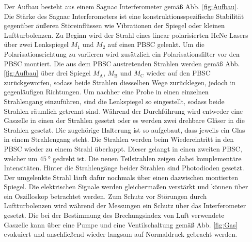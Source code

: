 Der Aufbau besteht aus einem Sagnac Interferometer gemäß Abb. \ref{fig:Aufbau}. Die Stärke des Sagnac Interferometers ist eine konstruktionsspezifische Stabilität gegenüber äußeren Störeinflüssen wie Vibrationen der Spiegel oder kleinen Luftturbolenzen. Zu Beginn wird der Strahl eines linear polarisierten HeNe Lasers über zwei Lenkspiegel $M_\text{1}$ und $M_\text{2}$ auf einen PBSC gelenkt. Um die Polarisationsrichtung zu variieren wird zusätzlich ein Polarisationsfilter vor den PBSC montiert. Die aus dem PBSC austretenden Strahlen werden gemäß Abb. \ref{fig:Aufbau} über drei Spiegel $M_\text{A}$, $M_\text{B}$ und $M_\text{C}$ wieder auf den PBSC zurückgeworfen, sodass beide Strahlen diesselben Wege zurücklegen, jedoch in gegenläufigen Richtungen. Um nachher eine Probe in einen einzelnen Strahlengang einzuführen, sind die Lenkspiegel so eingestellt, sodass beide Strahlen räumlich getrennt sind. Während der Durchführung wird entweder eine Gaszelle in einen der Strahlen gesetzt oder es werden zwei drehbare Gläser in die Strahlen gesetzt. Die zugehörige Halterung ist so aufgebaut, dass jeweils ein Glas in einem Strahlengang steht. Die Strahlen werden beim Wiedereintritt in den PBSC wieder zu einem Strahl überlappt. Dieser gelangt in einen zweiten PBSC, welcher um $\SI{45}{\degree}$ gedreht ist. Die neuen Teilstrahlen zeigen dabei komplementäre Intensitäten. Hinter die Strahlengänge beider Strahlen sind Photodioden gesetzt. Der umgelenkte Strahl läuft dafür nochmals über einen dazwischen montierten Spiegel. Die elektrischen Signale werden gleichermaßen verstärkt und können über ein Oszilloskop betrachtet werden. Zum Schutz vor Störungen durch Luftturbolenzen wird während der Messungen ein Schutz über das Interferometer gesetzt. Die bei der Bestimmung des Brechungsindex von Luft verwendete Gaszelle kann über eine Pumpe und eine Ventilschaltung gemäß Abb. \ref{fig:Gas} evakuiert und anschließend wieder langsam auf Normaldruck gebracht werden.
